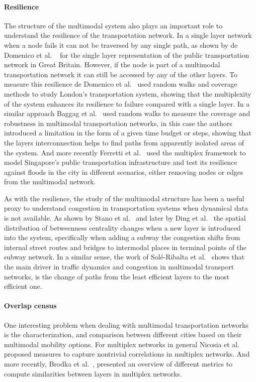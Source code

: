 \paragraph*{Resilience}
The structure of the multimodal system also plays an important role to understand the resilience of the transportation network. In a single layer network when a node fails it can not be traversed by any single path, as shown by de Domenico et al. ~\cite{dedomenico2019public} for the single layer representation of the public transportation network in Great Britain. However, if the node is part of a multimodal transportation network it can still be accessed by any of the other layers. To measure this resilience de Domenico et al.~\cite{dedomenico2014interconnected} used random walks and coverage methods to study London's transportation system, showing that the multiplexity of the system enhances its resilience to failure compared with a single layer. In a similar approach Baggag et al.~\cite{baggag2018resilience} used random walks to measure the coverage and robustness in multimodal transportation networks, in this case the authors introduced a limitation in the form of a given time budget or steps, showing that the layers interconnection helps to find paths from apparently isolated areas of the system. And more recently Ferretti et al.~\cite{ferretti2019resilience} used the multiplex framework to model Singapore's public transportation infrastructure and test its resilience against floods in the city in different scenarios, either removing nodes or edges from the multimodal network.

As with the resilience, the study of the multimodal structure has been a useful proxy to understand congestion in transportation systems when dynamical data is not available. As shown by Stano et al.~\cite{strano2015features} and later by Ding et al.~\cite{ding2018traffic} the spatial distribution of betweenness centrality changes when a new layer is introduced into the system, specifically when adding a subway the congestion shifts from internal street routes and bridges to intermodal places in terminal points of the subway network. In a similar sense, the work of Sol\'{e}-Ribalta et al.~\cite{sole-ribalta2016congestion} shows that the main driver in traffic dynamics and congestion in multimodal transport networks, is the change of paths from the least efficient layers to the most efficient one.


\paragraph*{Overlap census}\label{overlap}
One interesting problem when dealing with multimodal transportation networks is the characterization, and comparison between different cities based on their multimodal mobility options. For multiplex networks in general Nicosia et al.~\cite{nicosia2015measuring} proposed measures to capture nontrivial correlations in multiplex networks. And more recently, Brodka et al.~\cite{brodka2017similarity}, presented an overview of different metrics to compute similarities between layers in multiplex networks.

